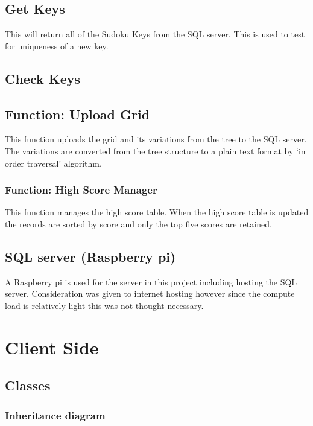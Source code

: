 \documentclass[fleqn]{article}
\begin{document}
\subsection{Get Keys}
This will return all of the Sudoku Keys from the SQL server. This is used to test for uniqueness of a new key.

\subsection{Check Keys}
\subsection*{Function: Upload Grid}

This function uploads the grid and its variations from the tree to the SQL server. The variations are converted from the tree structure to a plain text format by ‘in order traversal’ algorithm.

\subsubsection*{Function: High Score Manager}
This function manages the high score table. When the high score table is updated the records are sorted by score and only the top five scores are retained.

\subsection{SQL server (Raspberry pi)}
A Raspberry pi is used for the server in this project including hosting the SQL server. Consideration was given to internet hosting however since the compute load is relatively light this was not thought necessary.


\section{Client Side}
\subsection{Classes}
\subsubsection{Inheritance diagram}



\end{document}
